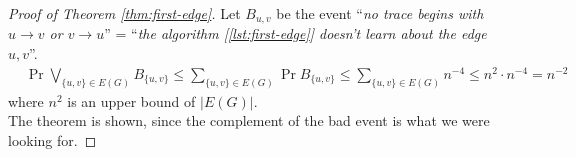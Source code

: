 \begin{proof}[Proof of Theorem \ref{thm:first-edge}]
    Let $B_{u,v}$ be the event ``\textit{no trace begins with $u \to v$ or $v \to u$}'' = ``\textit{the algorithm [\ref{lst:first-edge}] doesn't learn about the edge {$u,v$}}''.
    \begin{align*}
        &\Pr{\bigvee_{\{u,v\} \in E(G)} B_{\{u,v\}}}
        \leq \sum_{\{u,v\} \in E(G)} \Pr{B_{\{u,v\}}}
        \leq \sum_{\{u,v\} \in E(G)} n^{-4}
        \leq n^2 \cdot n^{-4} = n^{-2}&
    \end{align*}
    where $n^2$ is an upper bound of $|E(G)|$.\\
    The theorem is shown, since the complement of the bad event is what we were looking for.
\end{proof}
